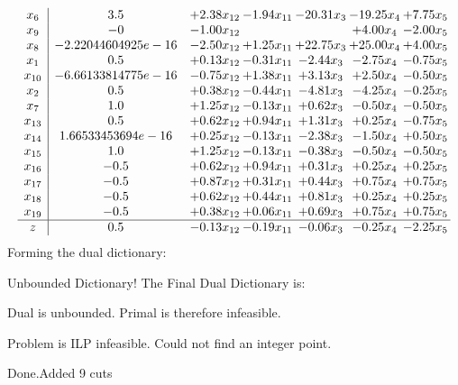 \documentclass[8pt]{article}
\begin{document}
\[\begin{array}{c| c c@{\hskip 2pt} c@{\hskip 2pt} c@{\hskip 2pt} c@{\hskip 2pt} c@{\hskip 2pt} }
 x_{6}   &  3.5 & +  2.38 x_{12} & -1.94 x_{11} & -20.31 x_{3} & -19.25 x_{4} & +  7.75 x_{5}\\
 x_{9}   &  -0 & -1.00 x_{12} &    &   & +  4.00 x_{4} & -2.00 x_{5}\\
 x_{8}   &  -2.22044604925e-16 & -2.50 x_{12} & +  1.25 x_{11} & + 22.75 x_{3} & + 25.00 x_{4} & +  4.00 x_{5}\\
 x_{1}   &  0.5 & +  0.13 x_{12} & -0.31 x_{11} & -2.44 x_{3} & -2.75 x_{4} & -0.75 x_{5}\\
 x_{10}   &  -6.66133814775e-16 & -0.75 x_{12} & +  1.38 x_{11} & +  3.13 x_{3} & +  2.50 x_{4} & -0.50 x_{5}\\
 x_{2}   &  0.5 & +  0.38 x_{12} & -0.44 x_{11} & -4.81 x_{3} & -4.25 x_{4} & -0.25 x_{5}\\
 x_{7}   &  1.0 & +  1.25 x_{12} & -0.13 x_{11} & +  0.62 x_{3} & -0.50 x_{4} & -0.50 x_{5}\\
 x_{13}   &  0.5 & +  0.62 x_{12} & +  0.94 x_{11} & +  1.31 x_{3} & +  0.25 x_{4} & -0.75 x_{5}\\
 x_{14}   &  1.66533453694e-16 & +  0.25 x_{12} & -0.13 x_{11} & -2.38 x_{3} & -1.50 x_{4} & +  0.50 x_{5}\\
 x_{15}   &  1.0 & +  1.25 x_{12} & -0.13 x_{11} & -0.38 x_{3} & -0.50 x_{4} & -0.50 x_{5}\\
 x_{16}   &  -0.5 & +  0.62 x_{12} & +  0.94 x_{11} & +  0.31 x_{3} & +  0.25 x_{4} & +  0.25 x_{5}\\
 x_{17}   &  -0.5 & +  0.87 x_{12} & +  0.31 x_{11} & +  0.44 x_{3} & +  0.75 x_{4} & +  0.75 x_{5}\\
 x_{18}   &  -0.5 & +  0.62 x_{12} & +  0.44 x_{11} & +  0.81 x_{3} & +  0.25 x_{4} & +  0.25 x_{5}\\
 x_{19}   &  -0.5 & +  0.38 x_{12} & +  0.06 x_{11} & +  0.69 x_{3} & +  0.75 x_{4} & +  0.75 x_{5}\\
\hline
z    &  0.5 & -0.13 x_{12} & -0.19 x_{11} & -0.06 x_{3} & -0.25 x_{4} & -2.25 x_{5}\\
\end{array}\]
Forming the dual dictionary:

Unbounded Dictionary!
The Final Dual Dictionary is: 

 Dual is unbounded. Primal is therefore infeasible. 

Problem is ILP infeasible. Could not find an integer point. 

Done.Added 9 cuts 
\end{document}
